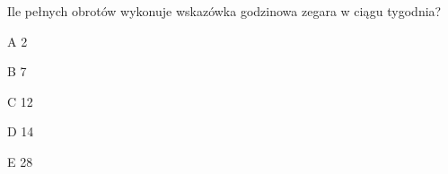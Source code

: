 \begin{tresc}
Ile pełnych obrotów wykonuje wskazówka godzinowa zegara w ciągu tygodnia?
\end{tresc}
\begin{wariant}{A} 2 \end{wariant}
\begin{wariant}{B} 7 \end{wariant}
\begin{wariant}{C} 12 \end{wariant}
\begin{wariant}{D} 14 \end{wariant}
\begin{wariant}{E} 28 \end{wariant}
